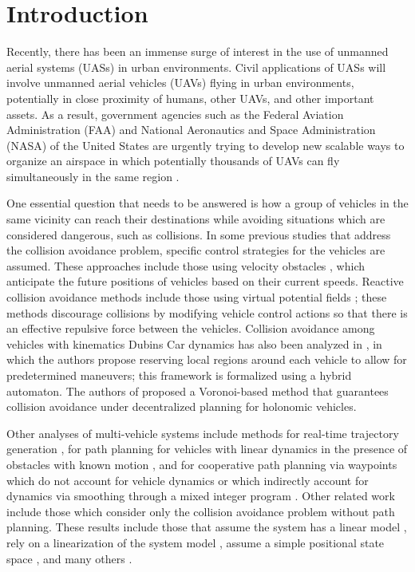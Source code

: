 \section{Introduction}
Recently, there has been an immense surge of interest in the use of unmanned aerial systems (UASs) in urban environments. 
Civil applications of UASs will involve unmanned aerial vehicles (UAVs) flying in urban environments, potentially in close proximity of humans, other UAVs, and other important assets. 
As a result, government agencies such as the Federal Aviation Administration (FAA) and National Aeronautics and Space Administration (NASA) of the United States are urgently trying to develop new scalable ways to organize an airspace in which potentially thousands of UAVs can fly simultaneously in the same region \cite{FAA13, Kopardekar16}.

One essential question that needs to be answered is how a group of vehicles in the same vicinity can reach their destinations while avoiding situations which are considered dangerous, such as collisions. In some previous studies that address the collision avoidance problem, specific control strategies for the vehicles are assumed. These approaches include those using velocity obstacles \cite{Fiorini98, Vandenberg08,Wu2012,Giese2014}, which anticipate the future positions of vehicles based on their current speeds. Reactive collision avoidance methods include those using virtual potential fields \cite{Olfati-Saber2002, Chuang07}; these methods discourage collisions by modifying vehicle control actions so that there is an effective repulsive force between the vehicles. Collision avoidance among vehicles with kinematics Dubins Car dynamics has also been analyzed in \cite{Pallottino2007}, in which the authors propose reserving local regions around each vehicle to allow for predetermined maneuvers; this framework is formalized using a hybrid automaton. The authors of \cite{Zhou2017} proposed a Voronoi-based method that guarantees collision avoidance under decentralized planning for holonomic vehicles.

Other analyses of multi-vehicle systems include methods for real-time trajectory generation \cite{Feng-LiLian2002}, for path planning for vehicles with linear dynamics in the presence of obstacles with known motion \cite{Ahmadzadeh2009}, and for cooperative path planning via waypoints which do not account for vehicle dynamics \cite{Bellingham} or which indirectly account for dynamics via smoothing through a mixed integer program \cite{Mellinger2012a}. Other related work include those which consider only the collision avoidance problem without path planning. These results include those that assume the system has a linear model \cite{Beard2003, Schouwenaars2004, Stipanovic2007}, rely on a linearization of the system model \cite{Massink2001, Althoff2011}, assume a simple positional state space \cite{Lin2015}, and many others \cite{Lalish2008, Hoffmann2008, Chen2016}.

